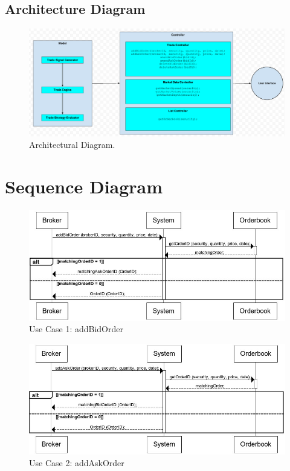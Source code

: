\documentclass[a4paper]{article}
\begin{document}
\begin {landscape}
\section {Architecture Diagram}
\begin{figure}
  \caption{Architectural Diagram.}
  \centering
    \includegraphics[width=1.6\textwidth]{ADiagram}
\end{figure}
\end {landscape}

\section {Sequence Diagram} 

\begin{figure}[h]
  \caption{Use Case 1: addBidOrder}
  \centering
    \includegraphics[width=1\textwidth]{addBidOrder}
\end{figure}

\begin{figure}[h]
  \caption{Use Case 2: addAskOrder}
  \centering
    \includegraphics[width=1\textwidth]{addAskOrder}
\end{figure}
\end{document}
